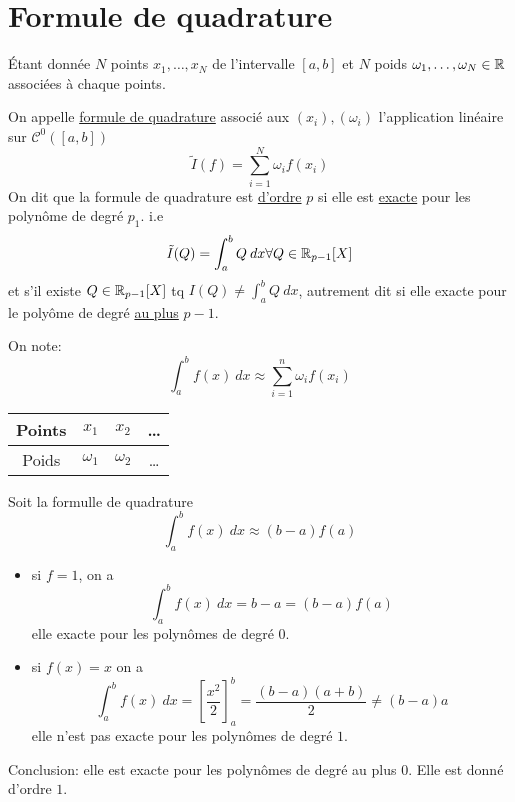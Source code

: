\section{Formule de quadrature}
\begin{definition}
    Étant donnée $N$ points  $x_1, \ldots, x_N$ de l'intervalle $[a, b]$  et $N$ poids  $\omega_1, \ldots, \omega_N \in \mathbb{R}$ associées à chaque points.
    \par
    On appelle \underline{formule de quadrature} associé aux $(x_i),(\omega_i)$ l'application linéaire sur  $\mathcal{C}^0([a, b])$
     \[
         \tilde{I}(f) = \sum_{i=1}^{N} \omega_i f(x_i)
    \] 
    On dit que la formule de quadrature est \underline{d'ordre} $p$ si elle est \underline{exacte} pour les polynôme de degré  $p_1$. i.e
     \[
         \tilde{I}(Q) = \int_{{a}}^{{b}} {Q} \: d{x} {} \forall Q \in \mathbb{R}_{p-1}[X]
    \] 
    et s'il existe $Q \in \mathbb{R}_{p-1}[X]$ tq $I(Q) \neq \int_{{a}}^{{b}} {Q} \: d{x}$, autrement dit si elle exacte pour le polyôme de degré \underline{au plus} $p-1$.
\end{definition}
\begin{remark}
   On note:
   \[
   \int_{{a}}^{{b}} {f(x)} \: d{x} \approx \sum_{i=1}^{n} \omega_i f(x_i)
   \] 
   \begin{center}
    \begin{tabular}{| c | c | c | c |}
        \hline
        Points & $x_1$ &  $x_2$ &  \ldots \\  
        \hline
        Poids & $\omega_1$ &  $\omega_2$ &  \ldots \\
        \hline
    \end{tabular}
\end{center}
\end{remark}
\begin{eg}
   Soit la formulle de quadrature 
   \[
   \int_{{a}}^{{b}} {f(x)} \: d{x} \approx (b-a)f(a)
   \] 
   \begin{itemize}
       \item si $f = 1$, on a  
           \[
               \int_{{a}}^{{b}} {f(x)} \: d{x} {} = b - a = (b-a)f(a)
           \] 
           elle exacte pour les polynômes de degré 0.
        \item si $f(x) = x$ on a
             \[
                 \int_{{a}}^{{b}} {f(x)} \: d{x} = \left[ \frac{x^2}{2} \right]_{a}^{b}  = \frac{(b-a)(a+b)}{2} \neq (b-a)a
            \] 
            elle n'est pas exacte pour les polynômes de degré $1$.
   \end{itemize}
   Conclusion: elle est exacte pour les polynômes de degré au plus 0. Elle est donné d'ordre $1$.
\end{eg}

